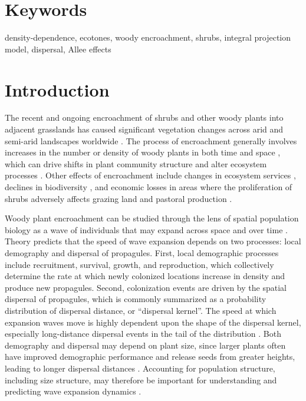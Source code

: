 \documentclass[11pt]{article}\usepackage[]{graphicx}\usepackage[usenames,dvipsnames]{xcolor}
\begin{document}
\section*{Keywords}

density-dependence, ecotones, woody encroachment, shrubs, integral projection model, dispersal, Allee effects

\newpage
\section*{Introduction}
The recent and ongoing encroachment of shrubs and other woody plants into adjacent grasslands has caused significant vegetation changes across arid and semi-arid landscapes worldwide \citep{van2000shrub, van2009causes, goslee2003high, gibbens2005vegetation,parizek2002soil, cabral2003shrub,trollope1989encroachment, roques2001dynamics}.
The process of encroachment generally involves increases in the number or density of woody plants in both time and space \citep{van2000shrub}, which can drive shifts in plant community structure and alter ecosystem processes \citep{schlesinger1990biological, ravi2009can,schlesinger1998plant, knapp2008shrub}.
Other effects of encroachment include changes in ecosystem services \citep{reed2015reorienting, kelleway2017review}, declines in biodiversity \citep{ratajczak2012woody, sirami2012changes, brandt2013regime}, and economic losses in areas where the proliferation of shrubs adversely affects grazing land and pastoral production \citep{mugasi2000economic, oba2000bush}.

Woody plant encroachment can be studied through the lens of spatial population biology as a wave of individuals that may expand across space and over time \citep{kot1996dispersal, neubert2000demography, wang2002integrodifference, pan2012invasion}.
Theory predicts that the speed of wave expansion depends on two processes: local demography and dispersal of propagules.
First, local demographic processes include recruitment, survival, growth, and reproduction, which collectively determine the rate at which newly colonized locations increase in density and produce new propagules. 
Second, colonization events are driven by the spatial dispersal of propagules, which is commonly summarized as a probability distribution of dispersal distance, or ``dispersal kernel''.
The speed at which expansion waves move is highly dependent upon the shape of the dispersal kernel, especially long-distance dispersal events in the tail of the distribution \citep{skarpaas2007dispersal}.
Both demography and dispersal may depend on plant size, since larger plants often have improved demographic performance and release seeds from greater heights, leading to longer dispersal distances \citep{nathan2011mechanistic}.
Accounting for population structure, including size structure, may therefore be important for understanding and predicting wave expansion dynamics \citep{neubert2000demography}.
\end{document}
